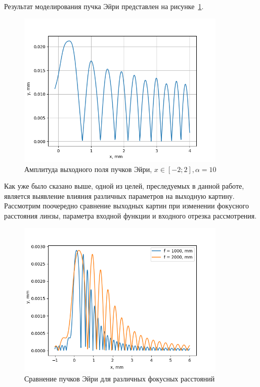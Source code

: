 {    Результат моделирования пучка Эйри представлен на рисунке~\ref{airyoutput}.
    \begin{figure}[H]
        \begin{center}
            \includegraphics[width=10cm]{plots/airyoutput}
            \caption{Амплитуда выходного поля пучков Эйри, $x \in [-2; 2],  \alpha  = 10$}
            \label{airyoutput}
        \end{center}

    \end{figure}

    Как уже было сказано выше, одной из целей, преследуемых в данной работе,
    является выявление влияния различных параметров на выходную картину.
    Рассмотрим поочередно сравнение выходных картин при изменении фокусного расстояния линзы,
    параметра входной функции и входного отрезка рассмотрения.

    \begin{figure}[H]
        \begin{center}
            \includegraphics[width=10cm]{plots/ai_focus_comparison}
            \caption{Сравнение пучков Эйри для различных фокусных расстояний}
            \label{ai_focus_comparison}
        \end{center}
    \end{figure}

}
